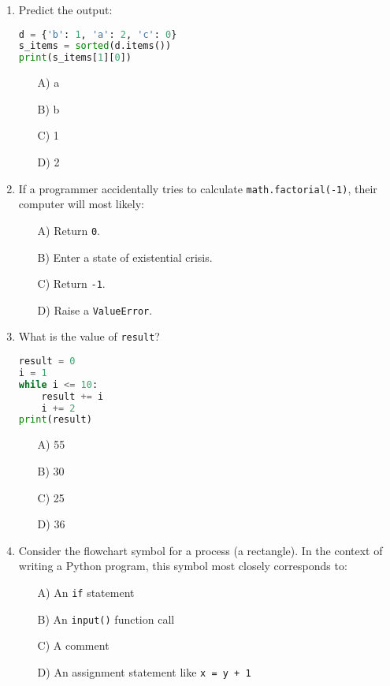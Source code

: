 \documentclass[9pt]{article}
\begin{document}
\begin{multicols}{2}
\begin{enumerate}
\item Predict the output:
\begin{lstlisting}[language=Python]
d = {'b': 1, 'a': 2, 'c': 0}
s_items = sorted(d.items())
print(s_items[1][0])
\end{lstlisting}
\begin{enumerate}
\item[A)] a
\item[B)] b
\item[C)] 1
\item[D)] 2
\end{enumerate}

\item If a programmer accidentally tries to calculate \texttt{math.factorial(-1)}, their computer will most likely:
\begin{enumerate}
    \item[A)] Return \texttt{0}.
    \item[B)] Enter a state of existential crisis.
    \item[C)] Return \texttt{-1}.
    \item[D)] Raise a \texttt{ValueError}.
\end{enumerate}

\item What is the value of \texttt{result}?
\begin{lstlisting}[language=Python]
result = 0
i = 1
while i <= 10:
    result += i
    i += 2
print(result)
\end{lstlisting}
\begin{enumerate}
\item[A)] 55
\item[B)] 30
\item[C)] 25
\item[D)] 36
\end{enumerate}

\item Consider the flowchart symbol for a process (a rectangle). In the context of writing a Python program, this symbol most closely corresponds to:
\begin{enumerate}
    \item[A)] An \texttt{if} statement
    \item[B)] An \texttt{input()} function call
    \item[C)] A comment
    \item[D)] An assignment statement like \texttt{x = y + 1}
\end{enumerate}


\end{enumerate}
\end{multicols}
\end{document}
